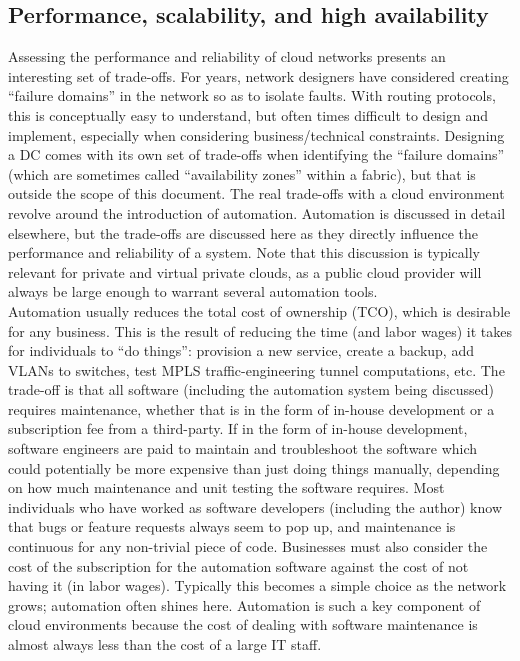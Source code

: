 \subsection{Performance, scalability, and high availability}
Assessing the performance and reliability of cloud networks presents an
interesting set of trade-offs. For years, network designers have considered
creating ``failure domains'' in the network so as to isolate faults. With
routing protocols, this is conceptually easy to understand, but often times
difficult to design and implement, especially when considering
business/technical constraints. Designing a DC comes with its own set of
trade-offs when identifying the ``failure domains'' (which are sometimes called
``availability zones'' within a fabric), but that is outside the scope of this
document. The real trade-offs with a cloud environment revolve around the
introduction of automation. Automation is discussed in detail elsewhere,
but the trade-offs are discussed here as they directly influence the
performance and reliability of a system. Note that this discussion is
typically relevant for private and virtual private clouds, as a public cloud
provider will always be large enough to warrant several automation tools. \\

Automation usually reduces the total cost of ownership (TCO), which is
desirable for any business. This is the result of reducing the time (and labor
wages) it takes for individuals to ``do things'': provision a new service,
create a backup, add VLANs to switches, test MPLS traffic-engineering tunnel
computations, etc. The trade-off is that all software (including the
automation system being discussed) requires maintenance, whether that is in
the form of in-house development or a subscription fee from a third-party. If
in the form of in-house development, software engineers are paid to maintain
and troubleshoot the software which could potentially be more expensive than
just doing things manually, depending on how much maintenance and unit testing
the software requires. Most individuals who have worked as software developers
(including the author) know that bugs or feature requests always seem to pop
up, and maintenance is continuous for any non-trivial piece of code.
Businesses must also consider the cost of the subscription for the automation
software against the cost of not having it (in labor wages). Typically this
becomes a simple choice as the network grows; automation often shines here.
Automation is such a key component of cloud environments because the cost of
dealing with software maintenance is almost always less than the cost of a
large IT staff. \\

